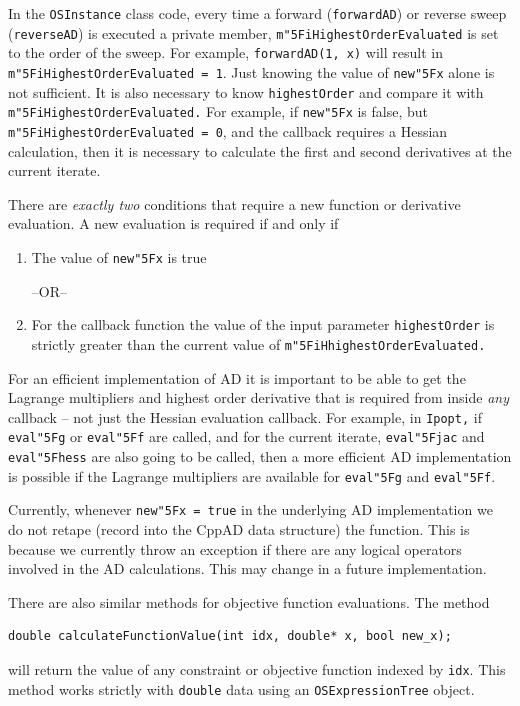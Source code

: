 \documentclass[11pt]{article}
\renewcommand{\_}{{\char"5F}}
\renewcommand{\{}{{\char"7B}}
\renewcommand{\}}{{\char"7D}}
\renewcommand{\^}{{\char"0D}}
\renewcommand{\'}{{\char"0D}}
\begin{document}
\begin{enumerate}[Step 1:]
In the {\tt OSInstance} class code,  every time a forward ({\tt forwardAD}) or reverse sweep ({\tt reverseAD}) is executed a private  member, {\tt m\_iHighestOrderEvaluated}  is  set to the order of the sweep. For example, {\tt forwardAD(1, x)} will result in {\tt  m\_iHighestOrderEvaluated = 1}.  Just knowing the value  of  {\tt new\_x} alone is not sufficient. It is also necessary  to know {\tt highestOrder} and compare it with {\tt m\_iHighestOrderEvaluated.}  For example, if  {\tt new\_x}  is  false,  but {\tt m\_iHighestOrderEvaluated = 0},  and   the callback requires a Hessian calculation, then it is necessary to calculate the first and second derivatives at the current iterate.

There are {\it  exactly two} conditions that  require a new function or derivative evaluation.   A new evaluation is required if and only if

\begin{enumerate}
\item{}   The value of {\tt new\_x} is  true

\begin{center}
 --OR--
\end{center}


\item{} For the callback function the value of the input parameter {\tt highestOrder} is strictly greater than the current value  of    {\tt m\_iHhighestOrderEvaluated.}
\end{enumerate}

For an efficient implementation of AD it is important to be able to get the Lagrange multipliers and highest order derivative that is required from inside {\it any} callback -- not just the Hessian evaluation callback. For example, in {\tt Ipopt,} if  {\tt eval\_g}  or {\tt eval\_f} are called, and  for the current iterate, {\tt eval\_jac} and {\tt eval\_hess} are also going to be called, then  a more efficient AD implementation is possible if the Lagrange multipliers are available for {\tt eval\_g} and {\tt eval\_f}.

Currently, whenever {\tt new\_x = true} in the underlying AD implementation we do not retape (record into the CppAD data structure)  the function. This is because we currently throw an exception if there are any logical operators involved in the AD calculations. This may change in a future implementation.


There are also similar methods for objective function evaluations.  The method
\begin{verbatim}
double calculateFunctionValue(int idx, double* x, bool new_x);
\end{verbatim}
 will return the value of any constraint or objective function indexed by {\tt idx}. This method works strictly with {\tt double} data using an {\tt OSExpressionTree} object.


\end{enumerate}
\end{document}
